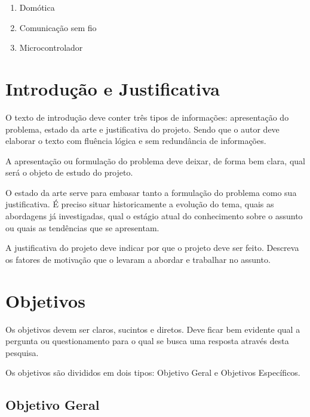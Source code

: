 \documentclass[
    12pt,               %
    a4paper,            %
    english,            %
    brazil,             %
    ]{article}
\begin{document}
        \begin{enumerate}
            \item Domótica
            \item Comunicação sem fio
            \item Microcontrolador
        \end{enumerate}


\section{Introdução e Justificativa}

O texto de introdução deve conter três tipos de informações: apresentação do problema, estado da arte e justificativa do projeto.  Sendo que o autor deve elaborar
o texto com fluência lógica e sem redundância de informações.

A apresentação ou formulação do problema deve deixar, de forma bem clara, qual será o objeto de estudo do projeto.

O estado da arte serve para embasar tanto a formulação do problema como sua justificativa. É preciso situar historicamente a evolução do tema,
quais as abordagens já investigadas, qual o estágio atual do conhecimento sobre o assunto ou quais as tendências que se apresentam.

A justificativa do projeto deve indicar por que o projeto deve ser feito. Descreva os fatores de motivação que o levaram a abordar e trabalhar no assunto.

\section{Objetivos}



Os objetivos devem ser claros, sucintos e diretos. Deve ficar bem evidente qual a pergunta ou questionamento para o qual se busca uma resposta através desta pesquisa.

Os objetivos são divididos em dois tipos: Objetivo Geral e Objetivos Específicos.

\subsection{Objetivo Geral}
\end{document}
